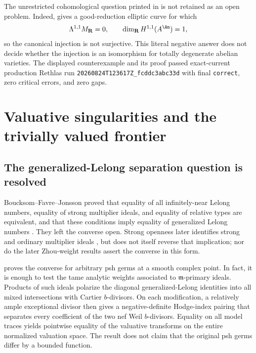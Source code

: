 The unrestricted cohomological question printed in
\cite[\S1.15]{GJR26} is not retained as an open problem.  Indeed,
 gives a good-reduction elliptic
curve for which
\[
 \Lambda^{1,1}M_{\mathbf R}=0,
 \qquad
 \dim_{\mathbf R}H^{1,1}(A^{\An})=1,
\]
so the canonical injection is not surjective.  This literal negative answer
does not decide whether the injection is an isomorphism for totally degenerate
abelian varieties.  The displayed counterexample and its proof passed
exact-current production Rethlas run
\nolinkurl{20260824T123617Z_fcddc3abc33d} with final \texttt{correct}, zero
critical errors, and zero gaps.

\section{Valuative singularities and the trivially valued frontier}
\label{sec:ch72-valuative-frontier}

\subsection{The generalized-Lelong separation question is resolved}
\label{sec:resolved-lelong-separation}

Boucksom--Favre--Jonsson proved that equality of all infinitely-near Lelong
numbers, equality of strong multiplier ideals, and equality of relative types
are equivalent, and that these conditions imply equality of generalized
Lelong numbers \cite{BFJ08}.  They left the converse open.  Strong openness
later identifies strong and ordinary multiplier ideals \cite{GZ15}, but does
not itself reverse that implication; nor do the later Zhou-weight results
assert the converse in this form.

 proves the converse for
arbitrary psh germs at a smooth complex point.  In fact, it is enough to
test the tame analytic weights associated to \(\mathfrak m\)-primary ideals.
Products of such ideals polarize the diagonal generalized-Lelong identities
into all mixed intersections with Cartier \(b\)-divisors.  On each
modification, a relatively ample exceptional divisor then gives a
negative-definite Hodge-index pairing that separates every coefficient of the
two nef Weil \(b\)-divisors.  Equality on all model traces yields pointwise
equality of the valuative transforms on the entire normalized valuation
space.  The result does not claim that the original psh germs differ by a
bounded function.

